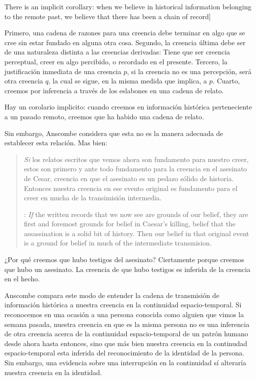 There is an implicit corollary: when we believe in historical information belonging to the remote past, we believe that there has been a chain of record]{Primero, una cadena de razones para una creencia debe terminar en algo que se cree sin estar fundado en alguna otra cosa. Segundo, la creencia última debe ser de una naturaleza distinta a las creencias derivadas: Tiene que ser creencia perceptual, creer en algo percibido, o recordado en el presente. Tercero, la justificación inmediata de una creencia $p$, si la creencia no es una percepción, será otra creencia $q$, la cual se sigue, en la misma medida que implica, a $p$. Cuarto, creemos por inferencia a través de los eslabones en una cadena de relato.

Hay un corolario implicito: cuando creemos en información histórica perteneciente a un pasado remoto, creemos que ha habido una cadena de relato.}

Sin embargo, Anscombe considera que esta no es la manera adecuada de establecer esta relación. Mas bien: \blockquote[{\cite[88]{anscombe1981parmenides:humeandjulius}}: \emph{If} the written records that we now see are grounds of our belief, they are first and foremost grounds for belief in Caesar's killing, belief that the assassination is a solid bit of history. Then our belief in that original event is a ground for belief in much of the intermediate transmision.]{\emph{Si} los relatos escritos que vemos ahora son fundamento para nuestro creer, estos son primero y ante todo fundamento para la creencia en el asesinato de Cesar, creencia en que el asesinato es un pedazo sólido de historia. Entonces nuestra creencia en ese evento original es fundamento para el creer en mucha de la transimisión intermedia.} ¿Por qué creemos que hubo testigos del asesinato? Ciertamente porque creemos que hubo un asesinato. La creencia de que hubo testigos es inferida de la creencia en el hecho.

Anscombe compara este modo de entender la cadena de transmisión de información histórica a nuestra creencia en la continuidad espacio-temporal. Si reconocemos en una ocasión a una persona conocida como alguien que vimos la semana pasada, nuestra creencia en que es la misma persona no es una inferencia de otra creencia acerca de la continuidad espacio-temporal de un patrón humano desde ahora hasta entonces, sino que más bien nuestra creencia en la continudad espacio-temporal esta inferida del reconocimiento de la identidad de la persona. Sin embargo, una evidencia sobre una interrupción en la continuidad sí alteraría nuestra creencia en la identidad.

